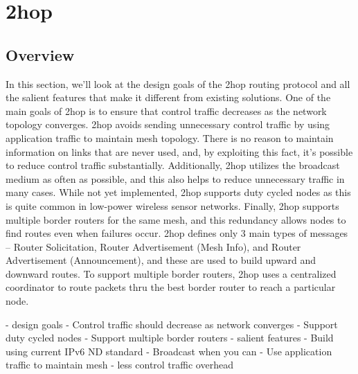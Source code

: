 \section{2hop}

\subsection{Overview}
In this section, we'll look at the design goals of the 2hop routing protocol and all the salient features that make it different from existing solutions. 
One of the main goals of 2hop is to ensure that control traffic decreases as the network topology converges. 
2hop avoids sending unnecessary control traffic by using application traffic to maintain mesh topology. 
There is no reason to maintain information on links that are never used, and, by exploiting this fact, it's possible to reduce control traffic substantially. 
Additionally, 2hop utilizes the broadcast medium as often as possible, and this also helps to reduce unnecessary traffic in many cases.
While not yet implemented, 2hop supports duty cycled nodes as this is quite common in low-power wireless sensor networks.
Finally, 2hop supports multiple border routers for the same mesh, and this redundancy allows nodes to find routes even when failures occur.
2hop defines only 3 main types of messages -- Router Solicitation, Router Advertisement (Mesh Info), and Router Advertisement (Announcement), and these are used to build upward and downward routes.
To support multiple border routers, 2hop uses a centralized coordinator to route packets thru the best border router to reach a particular node.

- design goals
    - Control traffic should decrease as network converges
    - Support duty cycled nodes
    - Support multiple border routers
- salient features
    - Build using current IPv6 ND standard
    - Broadcast when you can
    - Use application traffic to maintain mesh
    - less control traffic overhead
\fi

